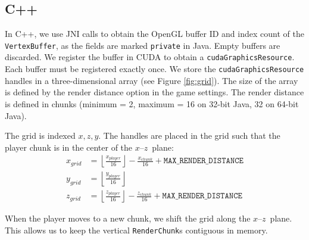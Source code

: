 \documentclass[]{article}
\begin{document}
\subsection{C++}
In C++, we use JNI calls to obtain the OpenGL buffer ID and index count of the \texttt{VertexBuffer}, as the fields are marked \texttt{private} in Java.
Empty buffers are discarded.
We register the buffer in CUDA to obtain a \texttt{cudaGraphicsResource}.
Each buffer must be registered exactly once.
We store the \texttt{cudaGraphicsResource} handles in a three-dimensional array (see Figure \ref{fig:grid}).
The size of the array is defined by the render distance option in the game settings.
The render distance is defined in chunks (minimum = 2, maximum = 16 on 32-bit Java, 32 on 64-bit Java).

The grid is indexed $x,z,y$.
The handles are placed in the grid such that the player chunk is in the center of the $x$\nobreakdash--$z$~plane:
\begin{align}
  x_{grid} &= \left\lfloor\frac{x_{player}}{16}\right\rfloor - \frac{x_{chunk}}{16} + \texttt{MAX\_RENDER\_DISTANCE} \nonumber \\
  y_{grid} &= \left\lfloor\frac{y_{player}}{16}\right\rfloor \nonumber \\
  z_{grid} &= \left\lfloor\frac{z_{player}}{16}\right\rfloor - \frac{z_{chunk}}{16} + \texttt{MAX\_RENDER\_DISTANCE} \nonumber
\end{align}

When the player moves to a new chunk, we shift the grid along the $x$\nobreakdash--$z$~plane.
This allows us to keep the vertical \texttt{RenderChunk}s contiguous in memory.
\end{document}
